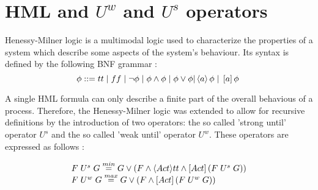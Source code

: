 \section{HML and $U^{w}$ and $U^{s}$ operators}

Henessy-Milner logic \cite{HenessyMilner} is a multimodal logic used to characterize the properties of a system which describe some aspects of the system's behaviour. Its syntax is defined by the following BNF grammar \cite{ModelingAndAnalysis2}:
\begin{equation}\label{eq:hml_bnf}
\phi ::= tt \hspace{1 mm} | \hspace{1 mm} ff \hspace{1 mm} | \hspace{1 mm} \neg\phi \hspace{1 mm} | \hspace{1 mm}\phi\wedge\phi \hspace{1 mm} |
\hspace{1 mm} \phi\vee\phi | \left\langle a\right\rangle \phi \hspace{1 mm} | \hspace{1 mm} \left[a\right]\phi \hspace{1 mm}
\end{equation}

A single HML formula can only describe a finite part of the overall behavious of a process. Therefore, the Henessy-Milner logic was extended to allow for recursive definitions by the introduction of two operators: the so called 'strong until' operator $U^{s}$ and the so called 'weak until' operator $U^{w}$. These operators are expressed as follows \cite{ReactiveSystems}:

\begin{equation}
	\begin{array}{lcl}
		F \hspace{1 mm} U^{s} \hspace{1 mm} G \stackrel{min}{=} G \vee \left(F \wedge \langle Act \rangle tt \wedge \left[Act\right]\left(F \hspace{1 mm} U^{s} \hspace{1 mm} G\right)\right)\\
		F \hspace{1 mm} U^{w} \hspace{1 mm} G \stackrel{max}{=} G \vee \left(F \wedge \left[Act\right] \left(F \hspace{1 mm} U^{w} \hspace{1 mm} G\right)\right)
	\end{array}
\end{equation}

